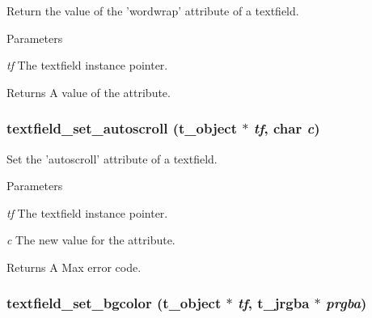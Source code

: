 Return the value of the 'wordwrap' attribute of a textfield. 
\begin{DoxyParams}{Parameters}
\item[{\em tf}]The textfield instance pointer. \end{DoxyParams}
\begin{DoxyReturn}{Returns}
A value of the attribute. 
\end{DoxyReturn}
\hypertarget{group__textfield_ga9e62ae7b82cb76dedac2a81cdc4e2a61}{
\subsubsection[{textfield\_\-set\_\-autoscroll}]{ textfield\_\-set\_\-autoscroll ({\bf t\_\-object} $\ast$ {\em tf}, \/  char {\em c})}}
\label{group__textfield_ga9e62ae7b82cb76dedac2a81cdc4e2a61}


Set the 'autoscroll' attribute of a textfield. 
\begin{DoxyParams}{Parameters}
\item[{\em tf}]The textfield instance pointer. \item[{\em c}]The new value for the attribute. \end{DoxyParams}
\begin{DoxyReturn}{Returns}
A Max error code. 
\end{DoxyReturn}
\hypertarget{group__textfield_gab015a56be805f8f29812c853f85a6924}{
\subsubsection[{textfield\_\-set\_\-bgcolor}]{ textfield\_\-set\_\-bgcolor ({\bf t\_\-object} $\ast$ {\em tf}, \/  {\bf t\_\-jrgba} $\ast$ {\em prgba})}}
\label{group__textfield_gab015a56be805f8f29812c853f85a6924}


